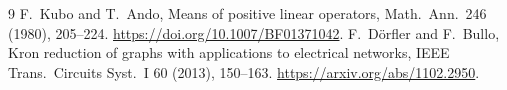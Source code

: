 \documentclass[11pt]{article}
\begin{document}
\begin{thebibliography}{9}
 F.~Kubo and T.~Ando,
Means of positive linear operators, Math.~Ann.~246 (1980), 205--224.
\url{https://doi.org/10.1007/BF01371042}.
 F.~D\"orfler and F.~Bullo,
Kron reduction of graphs with applications to electrical networks,
IEEE Trans.~Circuits Syst.~I 60 (2013), 150--163.
\url{https://arxiv.org/abs/1102.2950}.
\end{thebibliography}
\end{document}
